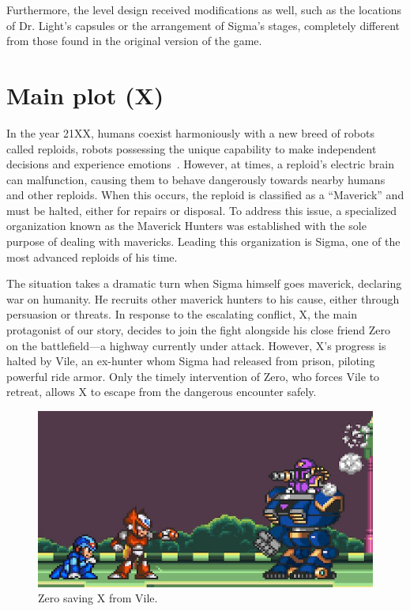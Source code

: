 Furthermore, the level design received modifications as well, such as the locations of Dr. Light's capsules or the arrangement of Sigma's stages, completely different from those found in the original version of the game. 

\section[Main plot]{Main plot (X)}
In the year 21XX, humans coexist harmoniously with a new breed of robots called reploids, robots possessing the unique capability to make independent decisions and experience emotions~\cite{Xcoll1:Manual_X1}. However, at times, a reploid's electric brain can malfunction, causing them to behave dangerously towards nearby humans and other reploids. When this occurs, the reploid is classified as a ``Maverick'' and must be halted, either for repairs or disposal. To address this issue, a specialized organization known as the Maverick Hunters was established with the sole purpose of dealing with mavericks. Leading this organization is Sigma, one of the most advanced reploids of his time.

The situation takes a dramatic turn when Sigma himself goes maverick, declaring war on humanity. He recruits other maverick hunters to his cause, either through persuasion or threats. In response to the escalating conflict, X, the main protagonist of our story, decides to join the fight alongside his close friend Zero on the battlefield—a highway currently under attack. However, X's progress is halted by Vile, an ex-hunter whom Sigma had released from prison, piloting powerful ride armor. Only the timely intervention of Zero, who forces Vile to retreat, allows X to escape from the dangerous encounter safely.

\begin{figure}[htp]
	\centering
	\includegraphics[width=0.5\linewidth]{figures/X1/Highway_end.jpg}
	\caption{Zero saving X from Vile.}
\end{figure}

